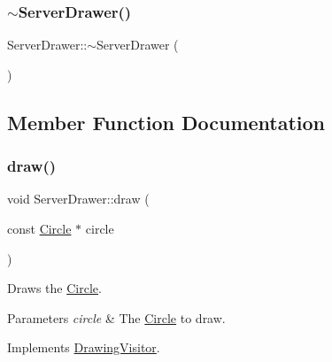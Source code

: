 \hypertarget{class_server_drawer_a40a7d8a070305d246bb12b23af81e72b}{}\label{class_server_drawer_a40a7d8a070305d246bb12b23af81e72b} 
\subsubsection{\texorpdfstring{$\sim$\+Server\+Drawer()}{~ServerDrawer()}}
{\footnotesize\ttfamily Server\+Drawer\+::$\sim$\+Server\+Drawer (\begin{DoxyParamCaption}{ }\end{DoxyParamCaption})\hspace{0.3cm}{\ttfamily [virtual]}}



\subsection{Member Function Documentation}
\hypertarget{class_server_drawer_a70bd94ed93c913b53d689fb8fc5dddc9}{}\label{class_server_drawer_a70bd94ed93c913b53d689fb8fc5dddc9} 
\subsubsection{\texorpdfstring{draw()}{draw()}\hspace{0.1cm}{\footnotesize\ttfamily [1/5]}}
{\footnotesize\ttfamily void Server\+Drawer\+::draw (\begin{DoxyParamCaption}\item[{const \hyperlink{class_circle}{Circle} $\ast$}]{circle }\end{DoxyParamCaption})\hspace{0.3cm}{\ttfamily [virtual]}}

Draws the \hyperlink{class_circle}{Circle}. 
\begin{DoxyParams}{Parameters}
{\em circle} & The \hyperlink{class_circle}{Circle} to draw. \\
\hline
\end{DoxyParams}


Implements \hyperlink{class_drawing_visitor_a287f6d770c755c1c3bc144fb08b65030}{Drawing\+Visitor}.

\hypertarget{class_server_drawer_a2bec9e70a1111d59b6c2d7de0908d780}{}\label{class_server_drawer_a2bec9e70a1111d59b6c2d7de0908d780} 
